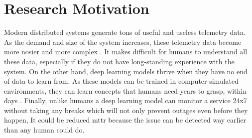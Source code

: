 \section{Research Motivation}

Modern distributed systems generate tons of useful and useless telemetry data. As the demand and size of the system increases, these telemetry data become more nosier and more complex \citep{Untangli35:online}. It makes difficult for humans to understand all these data, especially if they do not have long-standing experience with the system. On the other hand, deep learning models thrive when they have no end of data to learn from. As these models can be trained in computer-simulated environments, they can learn concepts that humans need years to grasp, within days \citep{OpenAI_dota, silver2017mastering}. Finally, unlike humans a deep learning model can monitor a service 24x7 without taking any breaks which will not only prevent outages even before they happen, It could be reduced \ac{mttr} because the issue can be detected way earlier than any human could do. 